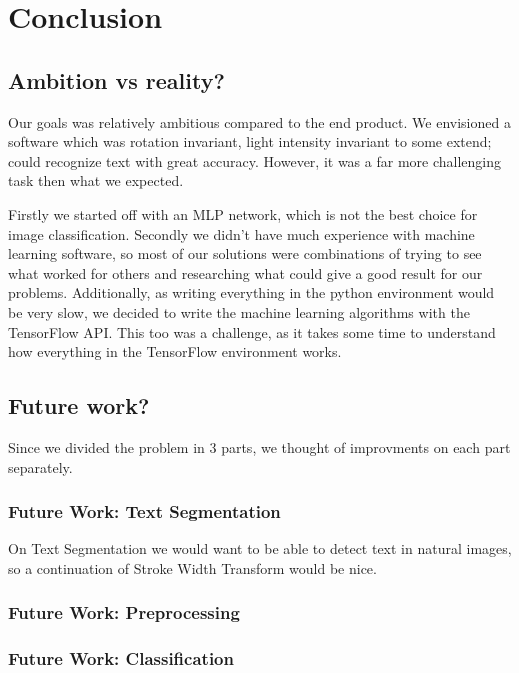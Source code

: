 \documentclass[Report.tex]{subfiles}
\begin{document}
\chapter{Conclusion}
\label{chap:Conclusion}

\section{Ambition vs reality?}
\begin{flushleft}
Our goals was relatively ambitious compared to the end product. We envisioned
a software which was rotation invariant, light intensity invariant to some
extend; could recognize text with great accuracy. However, it was a far more
challenging task then what we expected. \par
Firstly we started off with an MLP network, which is not the best choice for
image classification. Secondly we didn't have much experience with
machine learning software, so most of our solutions were combinations of
trying to see what worked for others and researching what could give a good result for
our problems. Additionally, as writing everything in the python environment
would be very slow, we decided to write the machine learning algorithms with the
TensorFlow API. This too was a challenge, as it takes some time to understand
how everything in the TensorFlow environment works.
\end{flushleft}

\section{Future work?}
Since we divided the problem in 3 parts, we thought of improvments on each part separately.

\subsection{Future Work: Text Segmentation}
On Text Segmentation we would want to be able to detect text in natural images, so a continuation of Stroke Width Transform would be nice.

\subsection{Future Work: Preprocessing}

\subsection{Future Work: Classification}
\end{document}
